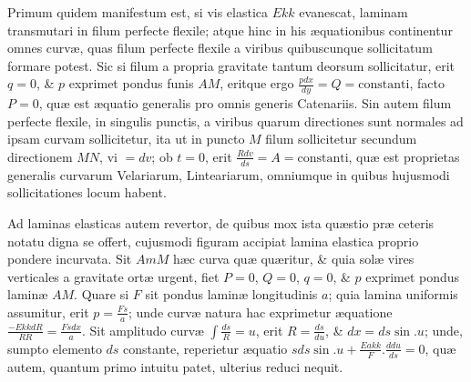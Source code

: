 Primum quidem manifestum est, si vis elastica $Ekk$ evanescat, laminam transmutari in filum perfecte flexile; atque hinc in his æquationibus continentur omnes curvæ, quas filum perfecte flexile a viribus quibuscunque sollicitatum formare potest. Sic si filum a propria gravitate tantum deorsum sollicitatur, erit
$q=0$, \& $p$ exprimet pondus funis $AM$, eritque ergo $\frac{pdx}{dy}=Q=\text{constanti}$, facto $P=0$, quæ est æquatio generalis pro omnis generis Catenariis. Sin autem filum perfecte flexile, in singulis punctis, a viribus quarum directiones sunt normales ad ipsam curvam sollicitetur, ita ut in puncto $M$ filum sollicitetur secundum directionem $MN$, vi $=dv$; ob $t=0$, erit $\frac{Rdv}{ds}=A=\text{constanti}$, quæ est proprietas generalis curvarum Velariarum, Linteariarum, omniumque in quibus hujusmodi sollicitationes locum habent.

Ad laminas elasticas autem revertor, de quibus mox ista quæstio præ ceteris notatu digna se offert, cujusmodi figuram accipiat lamina elastica proprio pondere incurvata. Sit $AmM$ hæc curva quæ quæritur, \& quia solæ vires verticales a gravitate ortæ urgent, fiet $P=0$, $Q=0$, $q=0$, \& $p$ exprimet pondus laminæ $AM$. Quare si $F$ sit pondus laminæ longitudinis $a$; quia lamina uniformis assumitur, erit $p=\frac{Fs}a$; unde curvæ natura hac exprimetur æquatione $\frac{-EkkdR}{RR}=\frac{Fsdx}a$. Sit amplitudo curvæ $\int\frac{ds}R=u$, erit $R=\frac{ds}{du}$, \& $dx=ds\sin.u$; unde, sumpto elemento $ds$ constante, reperietur æquatio $sds\sin.u+\frac{Eakk}F.\frac{ddu}{ds}=0$, quæ autem, quantum primo intuitu patet, ulterius reduci nequit.

